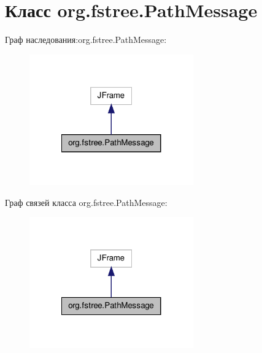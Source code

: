 \hypertarget{classorg_1_1fstree_1_1_path_message}{
\section{Класс org.fstree.PathMessage}
\label{classorg_1_1fstree_1_1_path_message}
}


Граф наследования:org.fstree.PathMessage:\nopagebreak
\begin{figure}[H]
\begin{center}
\leavevmode
\includegraphics[width=200pt]{classorg_1_1fstree_1_1_path_message__inherit__graph}
\end{center}
\end{figure}


Граф связей класса org.fstree.PathMessage:\nopagebreak
\begin{figure}[H]
\begin{center}
\leavevmode
\includegraphics[width=200pt]{classorg_1_1fstree_1_1_path_message__coll__graph}
\end{center}
\end{figure}
